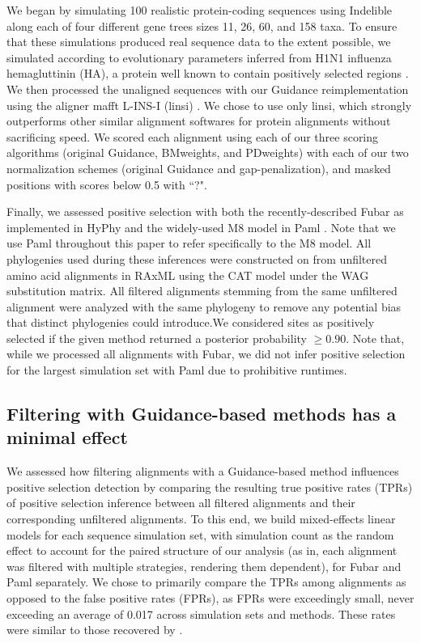 \documentclass[10pt]{article}
\begin{document}
We began by simulating 100 realistic protein-coding sequences using Indelible \citep{Fletcher2009} along each of four different gene trees sizes 11, 26, 60, and 158 taxa. To ensure that these simulations produced real sequence data to the extent possible, we simulated according to evolutionary parameters inferred from H1N1 influenza hemagluttinin (HA), a protein well known to contain positively selected regions \citep{Meyer2012}. We then processed the unaligned sequences with our Guidance reimplementation using the aligner mafft L-INS-I (linsi) \citep{Katoh2005}. We chose to use only linsi, which strongly outperforms other similar alignment softwares for protein alignments \citep{Thompson2011,Nuin2006} without sacrificing speed. We scored each alignment using each of our three scoring algorithms (original Guidance, BMweights, and PDweights) with each of our two normalization schemes (original Guidance and gap-penalization), and masked positions with scores below 0.5 with ``?".

Finally, we assessed positive selection with both the recently-described Fubar \citep{Murrell2013} as implemented in HyPhy \citep{Pond2005} and the widely-used M8 model in Paml \citep{Yang2007}. Note that we use Paml throughout this paper to refer specifically to the M8 model.  All phylogenies used during these inferences were constructed on from unfiltered amino acid alignments in RAxML \citep{Stamatakis2006} using the CAT model under the WAG substitution matrix. All filtered alignments stemming from the same unfiltered alignment were analyzed with the same phylogeny to remove any potential bias that distinct phylogenies could introduce.We considered sites as positively selected if the given method returned a posterior probability $\geq0.90$. Note that, while we processed all alignments with Fubar, we did not infer positive selection for the largest simulation set with Paml due to prohibitive runtimes. 


\subsection*{Filtering with Guidance-based methods has a minimal effect}

We assessed how filtering alignments with a Guidance-based method influences positive selection detection by comparing the resulting true positive rates (TPRs) of positive selection inference between all filtered alignments and their corresponding unfiltered alignments. To this end, we build mixed-effects linear models for each sequence simulation set, with simulation count as the random effect to account for the paired structure of our analysis (as in, each alignment was filtered with multiple strategies, rendering them dependent), for Fubar and Paml separately. We chose to primarily compare the TPRs among alignments as opposed to the false positive rates (FPRs), as FPRs were exceedingly small, never exceeding an average of 0.017 across simulation sets and methods. These rates were similar to those recovered by \citep{Jordan2011}. 
\end{document}
